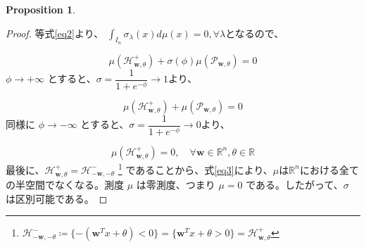 \documentclass[a4paper]{jsarticle}
\theoremstyle{definition}
\newtheorem{prop}[dfn]{Proposition}
\begin{document}
\begin{prop}
\begin{proof}
等式\eqref{eq2}より、 $\int_{I_n} \sigma_\lambda(x) d\mu(x)=0,\forall \lambda $となるので、

\[
\mu(\mathcal{H}^+_{\mathbf{w},\theta}) + \sigma(\phi)\mu(\mathcal{P}_{\mathbf{w},\theta}) = 0
\]
$\phi \to +\infty$ とすると、$\sigma = \dfrac{1}{1+e^{-\phi}}\to 1$より、

\[
\mu(\mathcal{H}^+_{\mathbf{w},\theta}) + \mu(\mathcal{P}_{\mathbf{w},\theta}) = 0
\]
同様に $\phi \to -\infty$ とすると、$\sigma = \dfrac{1}{1+e^{-\phi}}\to 0$より、

\begin{equation}
  \mu(\mathcal{H}^+_{\mathbf{w},\theta}) = 0, \quad \forall \mathbf{w} \in \mathbb{R}^n, \theta \in \mathbb{R}\label{eq3}
\end{equation}
最後に、$\mathcal{H}^+_{\mathbf{w},\theta} = \mathcal{H}^-_{-\mathbf{w},-\theta}$ \footnote{$\mathcal{H}^-_{-\mathbf{w},-\theta}\coloneq \{-(\mathbf{w}^T x+\theta)<0\} =\{\mathbf{w}^T x+\theta >0\}=\mathcal{H}^+_{\mathbf{w},\theta}$}
であることから、式\eqref{eq3}により、$\mu$は$\mathbb{R}^n$における全ての半空間でなくなる。測度 $\mu$ は零測度、つまり $\mu = 0$ である。したがって、$\sigma$ は区別可能である。
\end{proof} 
\end{prop}
\end{document}
